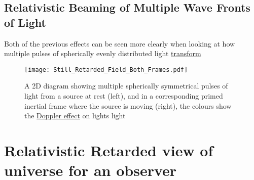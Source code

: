 \subsection{Relativistic Beaming of Multiple Wave Fronts of Light}

Both of the previous effects can be seen more clearly when looking at how multiple pulses of spherically evenly distributed light \hyperlink{def-transform}{transform} 
\begin{figure}[ht]
\centering
\texttt{[image: Still\_Retarded\_Field\_Both\_Frames.pdf]}
    \caption{A 2D diagram showing multiple spherically symmetrical pulses of light from a source at rest  (left), and in a corresponding primed inertial frame where the source is moving (right), the colours show the \protect\hyperlink{def-doppler-effect}{Doppler effect} on lights light}
    \label{fig: full field transformation}
\end{figure}

\section{Relativistic Retarded view of universe for an observer}

